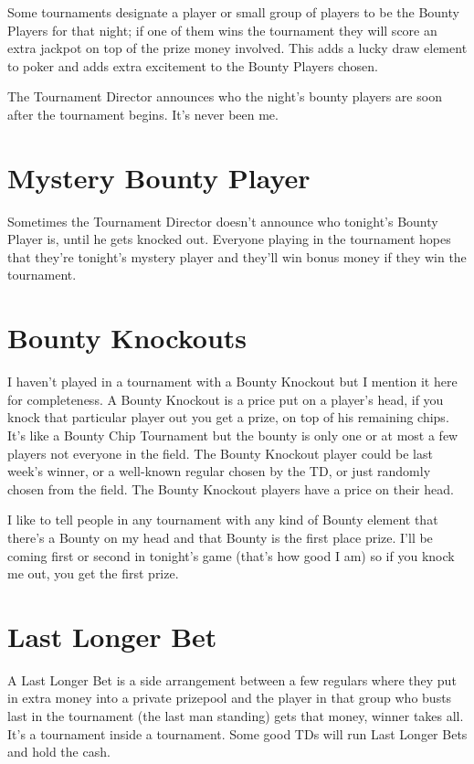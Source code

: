 Some tournaments designate a player or small group of players
to be the Bounty Players for that night; if one of them wins
the tournament they will score an extra jackpot on top of
the prize money involved. This adds a lucky draw element to
poker and adds extra excitement to the Bounty Players chosen.

The Tournament Director announces who the night's bounty players
are soon after the tournament begins. It's never been me.

\section{Mystery Bounty Player}

Sometimes the Tournament Director doesn't announce who tonight's
Bounty Player is, until he gets knocked out. Everyone playing in the
tournament hopes that they're tonight's mystery player and they'll
win bonus money if they win the tournament.

\section{Bounty Knockouts}

I haven't played in a tournament with a Bounty Knockout but I
mention it here for completeness. A Bounty Knockout is a price
put on a player's head, if you knock that particular player out
you get a prize, on top of his remaining chips. It's like a
Bounty Chip Tournament but the bounty is only one or at most
a few players not everyone in the field. The Bounty Knockout player
could be last week's winner, or a well-known regular chosen
by the TD, or just randomly chosen from the field. The Bounty Knockout
players have a price on their head.

I like to tell people in any tournament with any kind of Bounty
element that there's a Bounty on my head and that Bounty is the first
place prize. I'll be coming first or second in tonight's game (that's
how good I am) so if you knock me out, you get the first prize.

\section{Last Longer Bet}

A Last Longer Bet is a side arrangement between a few regulars
where they put in extra money into a private prizepool and the player
in that group who busts last in the tournament (the last man standing)
gets that money, winner takes all. It's a tournament inside a tournament.
Some good TDs will run Last Longer Bets and hold the cash.

